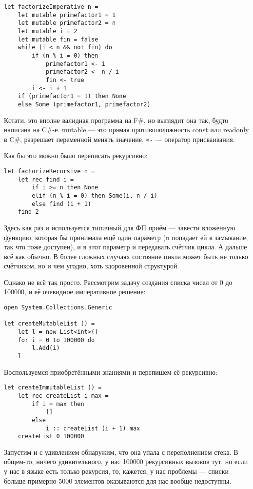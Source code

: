 \documentclass{../../text-style}
\begin{document}
\begin{verbatim}
let factorizeImperative n =
    let mutable primefactor1 = 1
    let mutable primefactor2 = n
    let mutable i = 2
    let mutable fin = false
    while (i < n && not fin) do
        if (n % i = 0) then
            primefactor1 <- i
            primefactor2 <- n / i
            fin <- true
        i <- i + 1
    if (primefactor1 = 1) then None
    else Some (primefactor1, primefactor2)
\end{verbatim}

Кстати, это вполне валидная программа на F\#, но выглядит она так, будто написана на C\#-е. mutable --- это прямая противоположность const или readonly в C\#, разрешает переменной менять значение, \verb|<-| --- оператор присваивания.

Как бы это можно было переписать рекурсивно:

\begin{verbatim}
let factorizeRecursive n =
    let rec find i =
        if i >= n then None
        elif (n % i = 0) then Some(i, n / i)
        else find (i + 1)
    find 2
\end{verbatim}

Здесь как раз и используется типичный для ФП приём --- завести вложенную функцию, которая бы принимала ещё один параметр (n попадает ей в замыкание, так что тоже доступен), и в этот параметр и передавать счётчик цикла. А дальше всё как обычно. В более сложных случаях состояние цикла может быть не только счётчиком, но и чем угодно, хоть здоровенной структурой.

Однако не всё так просто. Рассмотрим задачу создания списка чисел от 0 до 100000, и её очевидное императивное решение:

\begin{verbatim}
open System.Collections.Generic

let createMutableList () =
    let l = new List<int>()
    for i = 0 to 100000 do
        l.Add(i)
    l
\end{verbatim}

Воспользуемся приобретёнными знаниями и перепишем её рекурсивно:

\begin{verbatim}
let createImmutableList () =
    let rec createList i max =
        if i = max then
            []
        else
            i :: createList (i + 1) max
    createList 0 100000
\end{verbatim}

Запустим и с удивлением обнаружим, что она упала с переполнением стека. В общем-то, ничего удивительного, у нас 100000 рекурсивных вызовов тут, но если у нас в языке есть только рекурсия, то, кажется, у нас проблемы --- списки больше примерно 5000 элементов оказываются для нас вообще недоступны.
\end{document}
